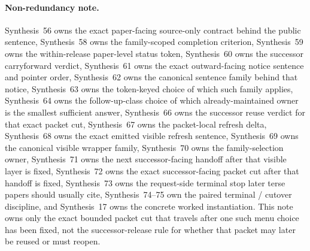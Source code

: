 \documentclass[11pt]{article}
\begin{document}
\paragraph{Non-redundancy note.}
Synthesis~56 owns the exact paper-facing source-only contract behind the public sentence, Synthesis~58 owns the family-scoped completion criterion, Synthesis~59 owns the within-release paper-level status token, Synthesis~60 owns the successor carryforward verdict, Synthesis~61 owns the exact outward-facing notice sentence and pointer order, Synthesis~62 owns the canonical sentence family behind that notice, Synthesis~63 owns the token-keyed choice of which such family applies, Synthesis~64 owns the follow-up-class choice of which already-maintained owner is the smallest sufficient answer, Synthesis~66 owns the successor reuse verdict for that exact packet cut, Synthesis~67 owns the packet-local refresh delta, Synthesis~68 owns the exact emitted visible refresh sentence, Synthesis~69 owns the canonical visible wrapper family, Synthesis~70 owns the family-selection owner, Synthesis~71 owns the next successor-facing handoff after that visible layer is fixed, Synthesis~72 owns the exact successor-facing packet cut after that handoff is fixed, Synthesis~73 owns the request-side terminal stop later terse papers should usually cite, Synthesis~74--75 own the paired terminal / cutover discipline, and Synthesis~17 owns the concrete worked instantiation.\cite{series:publicrequestcontracts,series:requestfulfillmentcertificates,series:publicrequeststatusenvelopes,series:publicrequestcarryforward,series:publicrequestnotices,series:publicrequestnoticenormalforms,series:publicrequestnoticeselections,series:publicrequestresponsemenus,series:publicrequestresponsepacketcarryforward,series:publicrequestresponsepacketdeltas,series:publicrequestresponsepacketrefreshnotices,series:publicrequestresponsepacketrefreshnoticenormalforms,series:publicrequestresponsepacketrefreshnoticeselections,series:publicrequestresponsepacketrefreshresponsemenus,series:publicrequestresponsepacketrefreshresponsepackets,series:publicrequestresponsepacketrefreshresponsepacketclosureverdicts,series:pairedterminalcitationdiscipline,series:pairedterminalcutoverrules,series:workedexample}
This note owns only the exact bounded packet cut that travels after one such menu choice has been fixed, not the successor-release rule for whether that packet may later be reused or must reopen.
\end{document}
